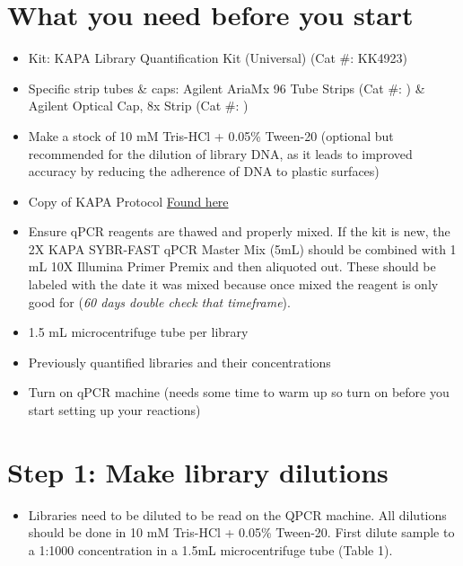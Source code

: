 \documentclass[
  letterpaper,
  DIV=11,
  numbers=noendperiod]{scrreprt}
\providecommand{\tightlist}{%
  \setlength{\itemsep}{0pt}\setlength{\parskip}{0pt}}\usepackage{longtable,booktabs,array}
\begin{document}
\hypertarget{what-you-need-before-you-start}{%
\section*{\texorpdfstring{\textbf{What you need before you
start}}{What you need before you start}}\label{what-you-need-before-you-start}}

\begin{itemize}
\item
  Kit: KAPA Library Quantification Kit (Universal) (Cat \#: KK4923)
\item
  Specific strip tubes \& caps: Agilent AriaMx 96 Tube Strips (Cat \#: )
  \& Agilent Optical Cap, 8x Strip (Cat \#: )
\item
  Make a stock of 10 mM Tris-HCl + 0.05\% Tween-20 (optional but
  recommended for the dilution of library DNA, as it leads to improved
  accuracy by reducing the adherence of DNA to plastic surfaces)
\item
  Copy of KAPA Protocol
  \href{https://rochesequencingstore.com/wp-content/uploads/2017/10/KAPA-Lib-Quant-ILMN_9.17-IfU_1.pdf}{Found
  here}
\item
  Ensure qPCR reagents are thawed and properly mixed. If the kit is new,
  the 2X KAPA SYBR-FAST qPCR Master Mix (5mL) should be combined with 1
  mL 10X Illumina Primer Premix and then aliquoted out. These should be
  labeled with the date it was mixed because once mixed the reagent is
  only good for (\emph{60 days double check that timeframe}).
\item
  1.5 mL microcentrifuge tube per library
\item
  Previously quantified libraries and their concentrations
\item
  Turn on qPCR machine (needs some time to warm up so turn on before you
  start setting up your reactions)
\end{itemize}

\hypertarget{step-1-make-library-dilutions}{%
\section*{\texorpdfstring{\textbf{Step 1: Make library
dilutions}}{Step 1: Make library dilutions}}\label{step-1-make-library-dilutions}}

\begin{itemize}
\tightlist
\item
  Libraries need to be diluted to be read on the QPCR machine. All
  dilutions should be done in 10 mM Tris-HCl + 0.05\% Tween-20. First
  dilute sample to a 1:1000 concentration in a 1.5mL microcentrifuge
  tube (Table 1).
\end{itemize}
\end{document}
